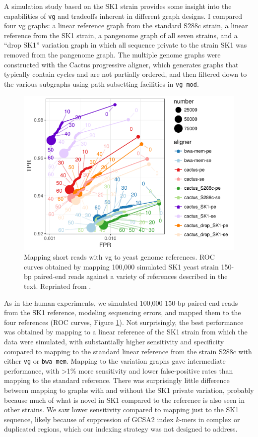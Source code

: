 A simulation study based on the SK1 strain provides some insight into the capabilities of {\tt vg} and tradeoffs inherent in different graph designs.
I compared four vg graphs: a linear reference graph from the standard S288c strain, a linear reference from the SK1 strain, a pangenome graph of all seven strains, and a ``drop SK1'' variation graph in which all sequence private to the strain SK1 was removed from the pangenome graph.
The multiple genome graphs were constructed with the Cactus progressive aligner, which generates graphs that typically contain cycles and are not partially ordered, and then filtered down to the various subgraphs using path subsetting facilities in {\tt vg mod}.

\begin{figure}[htbp!]
  \centering
  \includegraphics[width=1.0\textwidth]{Chapter3/Figs/e68fc338_test_sim_yeast_cactus-roc.pdf}
  \caption[Cactus yeast simulation]{Mapping short reads with vg to yeast genome references.
    ROC curves obtained by mapping 100,000 simulated SK1 yeast strain 150-bp paired-end reads against a variety of references described in the text.
    Reprinted from \cite{garrison2018variation}.}
  \label{fig:cactus_yeast_sim}
\end{figure}


As in the human experiments, we simulated 100,000 150-bp paired-end reads from the SK1 reference, modeling sequencing errors, and mapped them to the four references (ROC curves, Figure \ref{fig:cactus_yeast_sim}).
Not surprisingly, the best performance was obtained by mapping to a linear reference of the SK1 strain from which the data were simulated, with substantially higher sensitivity and specificity compared to mapping to the standard linear reference from the strain S288c with either {\tt vg} or {\tt bwa mem}.
Mapping to the variation graphs gave intermediate performance, with >1\% more sensitivity and lower false-positive rates than mapping to the standard reference.
There was surprisingly little difference between mapping to graphs with and without the SK1 private variation, probably because much of what is novel in SK1 compared to the reference is also seen in other strains.
We saw lower sensitivity compared to mapping just to the SK1 sequence, likely because of suppression of GCSA2 index $k$-mers in complex or duplicated regions, which our indexing strategy was not designed to address.

